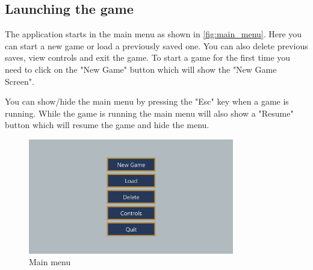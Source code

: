\subsection{Launching the game}
The application starts in the main menu as shown in \autoref{fig:main_menu}. 
Here you can start a new game or load a previously saved one.
You can also delete previous saves, view controls and exit the game.
To start a game for the first time you need to click on the "New Game" button which will show the "New Game Screen".

You can show/hide the main menu by pressing the "Esc" key when a game is running.
While the game is running the main menu will also show a "Resume" button which will resume the game and hide the menu.

\begin{figure}[H]
    \centering
    \includegraphics[width=0.8\textwidth]{sections/user_manual/resources/main-menu.png}
    \caption{Main menu}
    \label{fig:main_menu}
\end{figure}